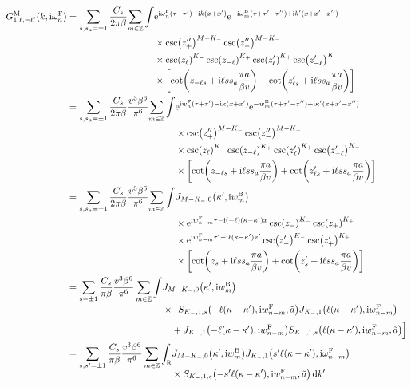 \documentclass[english, parskip=full]{scrartcl}
\begin{document}
\begin{align}
G_{1,\ell,-\ell'}^\M(k,\i\omega_n^\F) &= \sum_{s,s_a=\pm 1} \frac{C_s}{2\pi\beta} \bsplit{\sum_{m\in\mathbb{Z}} \int &\powe{\i \omega_n^\F(\tau+\tau') - \i k(x+x')} \powe{-\i\omega_m^\B(\tau+\tau'-\tau'') + \i k'(x+x'-x'')}\\
&\times \csc(z_+'')^{M-K_-} \csc(z_-'')^{M-K_-} \\
&\times \csc(z_\ell)^{K_-} \csc(z_{-\ell})^{K_+} \csc(z_\ell')^{K_+} \csc(z_{-\ell}')^{K_-}\\
&\times \klb*{\cot\kla*{z_{-\ell s} + \i \ell ss_a \frac{\pi a}{\beta v}} + \cot\kla*{z_{\ell s}' + \i \ell ss_a\frac{\pi a}{\beta v}}}}\\
 &= \sum_{s,s_a=\pm 1} \frac{C_s}{2\pi\beta} \frac{v^3\beta^6}{\pi^6} \bsplit{\sum_{m\in\mathbb{Z}} \int &\powe{\i w_n^\F (\tau+\tau') - \i \kappa (x+x')} \powe{-w_m^\B(\tau+\tau'-\tau'') + \i \kappa'(x+x'-x'')}\\
&\times \csc(z_+'')^{M-K_-} \csc(z_-'')^{M-K_-} \\
&\times \csc(z_\ell)^{K_-} \csc(z_{-\ell})^{K_+} \csc(z_\ell')^{K_+} \csc(z_{-\ell}')^{K_-}\\
&\times \klb*{\cot\kla*{z_{-\ell s} + \i \ell ss_a \frac{\pi a}{\beta v}} + \cot\kla*{z_{\ell s}' + \i \ell ss_a\frac{\pi a}{\beta v}}}}\\
&= \sum_{s,s_a=\pm 1} \frac{C_s}{2\pi\beta} \frac{v^3\beta^6}{\pi^6} \bsplit{\sum_{m\in\mathbb{Z}} \int &J_{M-K_-,0}\kla*{\kappa',\i w_m^\B} \\
&\times \powe{\i w_{n-m}^\F\tau - \i (-\ell) (\kappa-\kappa') x} \csc(z_-)^{K_-} \csc(z_+)^{K_+} \\
&\times \powe{\i w_{n-m}^\F\tau' - \i \ell (\kappa-\kappa') x'} \csc(z_-')^{K_-} \csc(z_+')^{K_+}\\
&\times \klb*{\cot\kla*{z_{s} + \i \ell ss_a \frac{\pi a}{\beta v}} + \cot\kla*{z_{s}' + \i \ell ss_a\frac{\pi a}{\beta v}}}} \\
&= \sum_{s=\pm 1} \frac{C_s}{\pi \beta} \frac{v^3\beta^6}{\pi^6} \sum_{m\in\mathbb{Z}} \bsplit{\int &J_{M-K_-,0}\kla*{\kappa',\i w_m^\B} \\
&\times \klb[\Big]{ S_{K_-,1,s}\kla*{-\ell(\kappa-\kappa'),\i w_{n-m}^\F, \tilde{a}} J_{K_-,1}\kla*{\ell(\kappa -\kappa'),\i w_{n-m}^\F} \\
&\quad + J_{K_-,1}\kla*{-\ell(\kappa-\kappa'),\i w_{n-m}^\F} S_{K_-,1,s}\kla*{\ell(\kappa-\kappa'),\i w_{n-m}^\F, \tilde{a}}}}\\
&= \sum_{s,s'=\pm 1} \frac{C_s}{\pi \beta} \frac{v^3\beta^6}{\pi^6} \sum_{m\in\mathbb{Z}} \bsplit{\int_\mathbb{R} &J_{M-K_-,0}\kla*{\kappa',\i w_m^\B} J_{K_-,1} \kla*{s'\ell(\kappa-\kappa'),\i\omega_{n-m}^\F} \\
&\times S_{K_-,1,s}\kla*{-s'\ell(\kappa-\kappa'), \i w_{n-m}^\F, \tilde{a}}\,\d k' }
\end{align}
\end{document}
